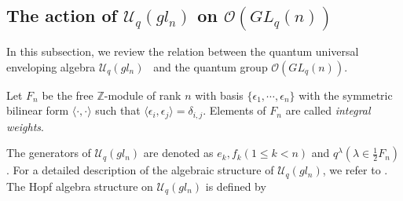 \documentclass[table,a4paper,reqno]{amsart}
\numberwithin{equation}{section}
\theoremstyle{definition}
\begin{document}
\subsection{The action of $\mathcal{U}_q(gl_n)$ on $\mathcal{O}(GL_q(n))$}
In this subsection, we review the relation between the quantum universal enveloping algebra $\mathcal{U}_q(gl_n)$~\cite{drinfeld1986quantum,jimbo1985aq} and the quantum group $\mathcal{O}(GL_q(n))$.

Let $F_n$ be the free $\mathbb{Z}$-module of rank $n$ with basis $\{\epsilon_1,\cdots,\epsilon_n\}$ with the symmetric bilinear form $\langle\cdot,\cdot\rangle$ such that $\langle\epsilon_i,\epsilon_j\rangle=\delta_{i,j}$. Elements of $F_n$ are called \textit{integral weights}.


The generators of $\mathcal{U}_q(gl_n)$ are denoted as $e_k,f_k(1\le k<n)$ and $q^\lambda(\lambda\in\frac{1}{2}F_n)$. For a detailed description of the algebraic structure of $\mathcal{U}_q(gl_n)$, we refer to \cite{noumi1993finite}. The Hopf algebra structure on $\mathcal{U}_q(gl_n)$ is defined by
\end{document}
